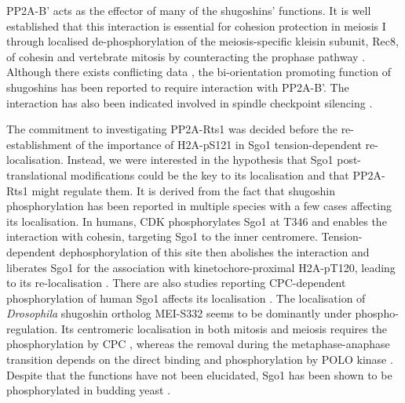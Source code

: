 PP2A-B' acts as the effector of many of the shugoshins' functions. It is well established that this interaction is essential for cohesion protection in meiosis I through localised de-phosphorylation of the meiosis-specific kleisin subunit, Rec8, of cohesin \citep{Marston2004a, Kitajima2004a, Katis2004, Rabitsch2004TwoII, Rattani2013Sgol2Oocytes, Llano2008Shugoshin-2Mice, Lee2008} and vertebrate mitosis by counteracting the prophase pathway \citep{Shintomi2009ReleasingSgo1, Rivera2009ShugoshinExtracts, Orth2011ShugoshinMad2, Huang2007, Tang2006a, Tanno2010, McGuinness2005ShugoshinCells, Kitajima2005, Salic2004VertebrateMitosis}. Although there exists conflicting data \citep{Verzijlbergen2014, Eshleman2014}, the bi-orientation promoting function of shugoshins has been reported to require interaction with PP2A-B'\citep{Peplowska2014, Rivera2012}. The interaction has also been indicated involved in spindle checkpoint silencing \citep{Rattani2013Sgol2Oocytes}. 

The commitment to investigating PP2A-Rts1 was decided before the re-establishment of the importance of H2A-pS121 in Sgo1 tension-dependent re-localisation. Instead, we were interested in the hypothesis that Sgo1 post-translational modifications could be the key to its localisation and that PP2A-Rts1 might regulate them. It is derived from the fact that shugoshin phosphorylation has been reported in multiple species \citep{Llano2008Shugoshin-2Mice, Tanno2010, Rattani2013Sgol2Oocytes, Pouwels2007ShugoshinPlk1, Kawashima2007, Lee2014RegulationPhosphorylation, Liu2013, Liu2013a, Clarke2005, Resnick2006INCENPDrosophila, Nogueira2014, Yahya2020} with a few cases affecting its localisation. In humans, CDK phosphorylates Sgo1 at T346 and enables the interaction with cohesin, targeting Sgo1 to the inner centromere. Tension-dependent dephosphorylation of this site then abolishes the interaction and liberates Sgo1 for the association with kinetochore-proximal H2A-pT120, leading to its re-localisation \citep{Liu2013, Liu2013a}. There are also studies reporting CPC-dependent phosphorylation of human Sgo1 affects its localisation \citep{Pouwels2007ShugoshinPlk1, Lee2014RegulationPhosphorylation}. The localisation of \textit{Drosophila} shugoshin ortholog MEI-S332 seems to be dominantly under phospho-regulation. Its centromeric localisation in both mitosis and meiosis requires the phosphorylation by CPC \citep{Resnick2006INCENPDrosophila, Nogueira2014}, whereas the removal during the metaphase-anaphase transition depends on the direct binding and phosphorylation by POLO kinase \citep{Clarke2005}. Despite that the functions have not been elucidated, Sgo1 has been shown to be phosphorylated in budding yeast \citep{Yahya2020, Barton2019MechanismsCerevisiae}. 

